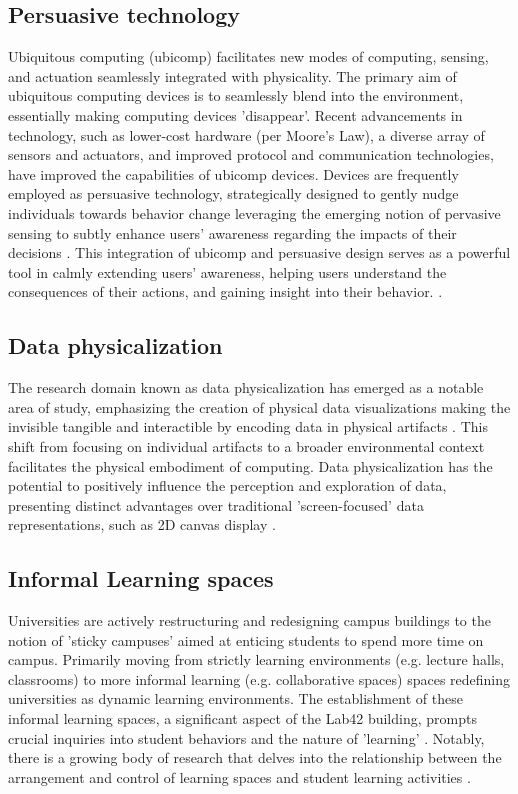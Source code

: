 \subsection{Persuasive technology}

Ubiquitous computing (ubicomp) facilitates new modes of computing, sensing, and actuation seamlessly integrated with physicality. The primary aim of ubiquitous computing devices is to seamlessly blend into the environment, essentially making computing devices 'disappear'\cite{weiser}. Recent advancements in technology, such as lower-cost hardware (per Moore's Law), a diverse array of sensors and actuators, and improved protocol and communication technologies, have improved the capabilities of ubicomp devices. Devices are frequently employed as persuasive technology, strategically designed to gently nudge individuals towards behavior change leveraging the emerging notion of pervasive sensing to subtly enhance users' awareness regarding the impacts of their decisions  \cite{twinkly}. This integration of ubicomp and persuasive design serves as a powerful tool in calmly extending users' awareness, helping users understand the consequences of their actions, and gaining insight into their behavior. \cite{calm}.

\subsection{Data physicalization}

The research domain known as data physicalization has emerged as a notable area of study, emphasizing the creation of physical data visualizations making the invisible tangible and interactible by encoding data in physical artifacts \cite{tangible}. This shift from focusing on individual artifacts to a broader environmental context facilitates the physical embodiment of computing. Data physicalization has the potential to positively influence the perception and exploration of data, presenting distinct advantages over traditional 'screen-focused' data representations, such as 2D canvas display \cite{physicalization}.

\subsection{Informal Learning spaces}

Universities are actively restructuring and redesigning campus buildings to the notion of 'sticky campuses' \cite{sticky} aimed at enticing students to spend more time on campus. Primarily moving from strictly learning environments (e.g. lecture halls, classrooms) to more informal learning (e.g. collaborative spaces) spaces redefining universities as dynamic learning environments. The establishment of these informal learning spaces, a significant aspect of the Lab42 building, prompts crucial inquiries into student behaviors and the nature of 'learning' \cite{critical}. Notably, there is a growing body of research that delves into the relationship between the arrangement and control of learning spaces and student learning activities \cite{learning}.